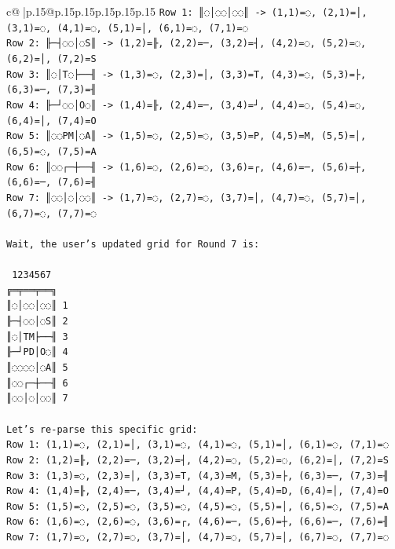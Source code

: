 \documentclass{article}
\begin{document}
{\begin{supertabular}{c@{$\;$}|p{.15\linewidth}@{}p{.15\linewidth}p{.15\linewidth}p{.15\linewidth}p{.15\linewidth}p{.15\linewidth}}
{{{\texttt{Row 1: ║◌│◌◌│◌◌║ {-}> (1,1)=◌, (2,1)=│, (3,1)=◌, (4,1)=◌, (5,1)=│, (6,1)=◌, (7,1)=◌} \\
\texttt{Row 2: ╟─┤◌◌│◌S║ {-}> (1,2)=╟, (2,2)=─, (3,2)=┤, (4,2)=◌, (5,2)=◌, (6,2)=│, (7,2)=S} \\
\texttt{Row 3: ║◌│T◌├──╢ {-}> (1,3)=◌, (2,3)=│, (3,3)=T, (4,3)=◌, (5,3)=├, (6,3)=─, (7,3)=╢} \\
\texttt{Row 4: ╟─┘◌◌│O◌║ {-}> (1,4)=╟, (2,4)=─, (3,4)=┘, (4,4)=◌, (5,4)=◌, (6,4)=│, (7,4)=O} \\
\texttt{Row 5: ║◌◌PM│◌A║ {-}> (1,5)=◌, (2,5)=◌, (3,5)=P, (4,5)=M, (5,5)=│, (6,5)=◌, (7,5)=A} \\
\texttt{Row 6: ║◌◌┌─┼──╢ {-}> (1,6)=◌, (2,6)=◌, (3,6)=┌, (4,6)=─, (5,6)=┼, (6,6)=─, (7,6)=╢} \\
\texttt{Row 7: ║◌◌│◌│◌◌║ {-}> (1,7)=◌, (2,7)=◌, (3,7)=│, (4,7)=◌, (5,7)=│, (6,7)=◌, (7,7)=◌} \\
\\ 
\texttt{Wait, the user's updated grid for Round 7 is:} \\
\\ 
\texttt{ 1234567} \\
\texttt{╔═╤══╤══╗} \\
\texttt{║◌│◌◌│◌◌║ 1} \\
\texttt{╟─┤◌◌│◌S║ 2} \\
\texttt{║◌│TM├──╢ 3} \\
\texttt{╟─┘PD│O◌║ 4} \\
\texttt{║◌◌◌◌│◌A║ 5} \\
\texttt{║◌◌┌─┼──╢ 6} \\
\texttt{║◌◌│◌│◌◌║ 7} \\
\\ 
\texttt{Let's re{-}parse this specific grid:} \\
\texttt{Row 1: (1,1)=◌, (2,1)=│, (3,1)=◌, (4,1)=◌, (5,1)=│, (6,1)=◌, (7,1)=◌} \\
\texttt{Row 2: (1,2)=╟, (2,2)=─, (3,2)=┤, (4,2)=◌, (5,2)=◌, (6,2)=│, (7,2)=S} \\
\texttt{Row 3: (1,3)=◌, (2,3)=│, (3,3)=T, (4,3)=M, (5,3)=├, (6,3)=─, (7,3)=╢} \\
\texttt{Row 4: (1,4)=╟, (2,4)=─, (3,4)=┘, (4,4)=P, (5,4)=D, (6,4)=│, (7,4)=O} \\
\texttt{Row 5: (1,5)=◌, (2,5)=◌, (3,5)=◌, (4,5)=◌, (5,5)=│, (6,5)=◌, (7,5)=A} \\
\texttt{Row 6: (1,6)=◌, (2,6)=◌, (3,6)=┌, (4,6)=─, (5,6)=┼, (6,6)=─, (7,6)=╢} \\
\texttt{Row 7: (1,7)=◌, (2,7)=◌, (3,7)=│, (4,7)=◌, (5,7)=│, (6,7)=◌, (7,7)=◌} \\
}}}
\end{supertabular}}
\end{document}
